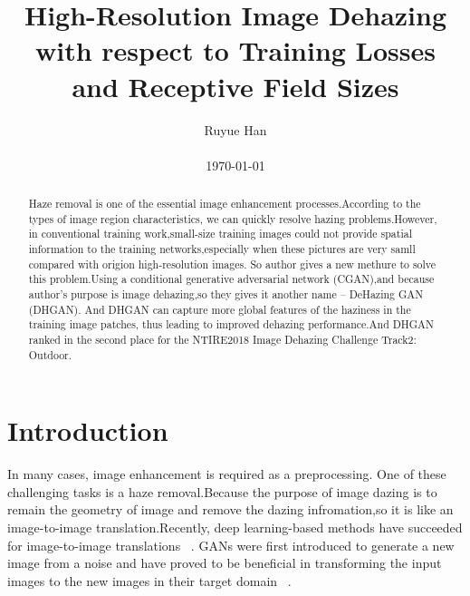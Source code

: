 \documentclass[10pt,twocolumn,letterpaper]{article}
\begin{document}
\title{High-Resolution Image Dehazing with respect to Training Losses and Receptive Field Sizes}

\author{Ruyue Han\\\\ \today}

\maketitle

\begin{abstract}
Haze removal is one of the essential image enhancement processes.According to the types of image region characteristics, we can quickly resolve hazing problems.However, in conventional training work,small-size training images could not provide spatial information to the training networks,especially when these pictures are very samll compared with origion high-resolution images. So author gives a new methure to solve this problem.Using a conditional generative adversarial network (CGAN),and because author's purpose is image dehazing,so they gives it another name -- DeHazing GAN (DHGAN). And DHGAN can capture more global features of the haziness in the training image patches, thus leading to improved dehazing performance.And DHGAN ranked in the second place for the NTIRE2018 Image
Dehazing Challenge Track2: Outdoor.

\end{abstract}
\section{Introduction}
In many cases, image enhancement is required as a preprocessing. One of these challenging tasks is a haze removal.Because the purpose of image dazing is to remain the geometry of image and remove the dazing infromation,so it is like an image-to-image translation.Recently, deep learning-based methods have succeeded
for image-to-image translations ~\cite{Image2017_1,Photographic2017_2}.
GANs were first introduced to generate a new image from a noise and have proved to be beneficial in transforming the input images to the new images in their target domain ~\cite{conditional2017_3,Single2013_4}.



\end{document}
